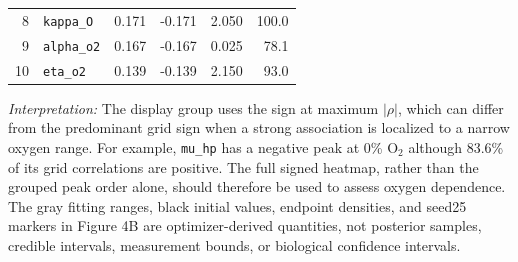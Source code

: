 \begin{table}[!htbp]
{\begin{tabular}{@{}rlrrrr@{}}
8 & \texttt{kappa\_O} & 0.171 & -0.171 & 2.050 & 100.0 \\
9 & \texttt{alpha\_o2} & 0.167 & -0.167 & 0.025 & 78.1 \\
10 & \texttt{eta\_o2} & 0.139 & -0.139 & 2.150 & 93.0 \\
\bottomrule
\end{tabular}%
}
\par\vspace{0.6em}
\begin{minipage}{0.96\textwidth}
\footnotesize
\textit{Interpretation:} The display group uses the sign at maximum $|\rho|$, which can differ from the predominant grid sign when a strong association is localized to a narrow oxygen range. For example, \texttt{mu\_hp} has a negative peak at 0\% O$_2$ although 83.6\% of its grid correlations are positive. The full signed heatmap, rather than the grouped peak order alone, should therefore be used to assess oxygen dependence. The gray fitting ranges, black initial values, endpoint densities, and seed25 markers in Figure 4B are optimizer-derived quantities, not posterior samples, credible intervals, measurement bounds, or biological confidence intervals.
\end{minipage}
\end{table}
